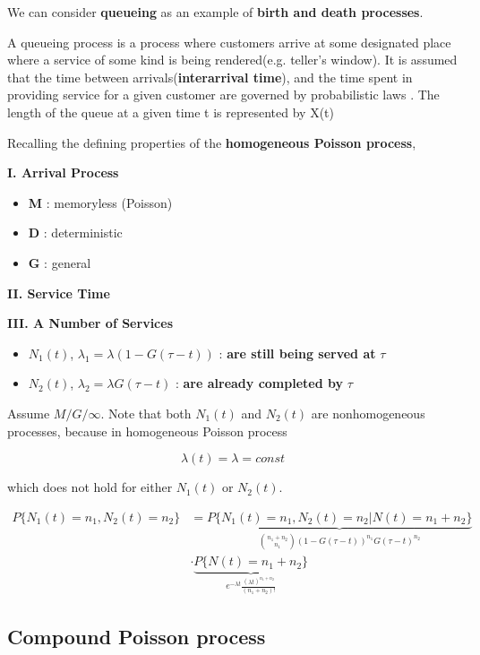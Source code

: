 \documentclass[12pt]{article}
\theoremstyle{nonumberbreak}
\begin{document}
We can consider \textbf{queueing} as an example of \textbf{birth and death processes}. 

A queueing process is a process where customers arrive at some designated place where a service of some kind is being rendered(e.g. teller's window). It is assumed that the time between arrivals(\textbf{interarrival time}), and the time spent in providing service for a given
customer are governed by probabilistic laws . The length of the queue at a
given time t is represented by X(t)


Recalling the defining properties of the \textbf{homogeneous Poisson process}, 

\textbf{I. Arrival Process}

\begin{itemize}
	\item \textbf{M} : memoryless (Poisson)
	\item \textbf{D} : deterministic
	\item \textbf{G} : general
\end{itemize}


\textbf{II. Service Time}

\textbf{III. A Number of Services}


\begin{itemize}
	\item $N_1(t)$, $\lambda_1 = \lambda (1 - G(\tau - t) )$ : \textbf{are still being served at} $\tau$
	\item $N_2(t)$, $\lambda_2 = \lambda G(\tau - t)$ : \textbf{are already completed by} $\tau$
\end{itemize}



Assume $M/G/\infty$. Note that both $N_1(t)$ and $N_2(t)$ are nonhomogeneous processes, because in homogeneous Poisson process

$$
\lambda(t) = \lambda = const
$$

which does not hold for either $N_1(t)$ or $N_2(t)$. 

$$
\begin{aligned}
P\{ N_1(t) = n_1,  N_2(t) = n_2 \} &= \underbrace{P\{ N_1(t) = n_1,  N_2(t) = n_2 | N(t) = n_1 + n_2 \}}_{\binom{n_1+n_2}{n_1} (1 - G(\tau -t))^{n_1} G(\tau -t)^{n_2} } \\[8pt]
&\cdot \underbrace{P\{ N(t) = n_1 + n_2 \}}_{e^{-\lambda t} \frac{(\lambda t)^{n_1 + n_2}}{(n_1+n_2)!}}
\end{aligned}
$$


\subsection{Compound Poisson process}
\end{document}
